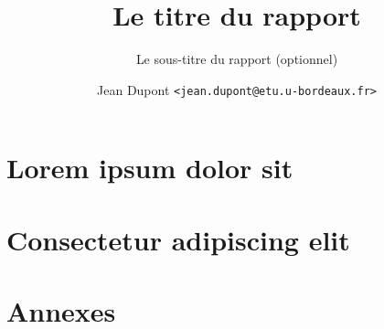 \documentclass[a4paper]{memoir}
\title{Le titre du rapport}
\subtitle{Le sous-titre du rapport (optionnel)}
\author{Jean Dupont \texttt{<jean.dupont@etu.u-bordeaux.fr>}}
\begin{document}
\frontmatter%
\maketitle
\thispagestyle{empty}





\cleardoublepage
\tableofcontents*



\mainmatter%
\part{Lorem ipsum dolor sit}




\part{Consectetur adipiscing elit}







\backmatter %

\nocite{*}



\printindex


\part*{Annexes}
\appendix



\end{document}
